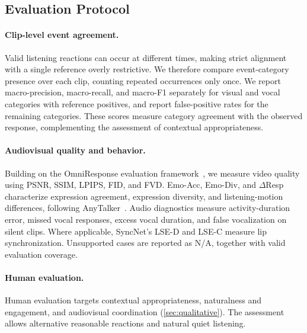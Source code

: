 \subsection{Evaluation Protocol}
\label{sec:evaluation}

\paragraph{Clip-level event agreement.}
Valid listening reactions can occur at different times,
making strict alignment with a single reference overly
restrictive. We therefore compare event-category presence
over each clip, counting repeated occurrences only once.
We report macro-precision, macro-recall, and macro-F1
separately for visual and vocal categories with reference
positives, and report false-positive rates for the remaining
categories. These scores measure category agreement with
the observed response, complementing the assessment of
contextual appropriateness.

\paragraph{Audiovisual quality and behavior.}
Building on the OmniResponse evaluation
framework~\cite{omniresponse}, we measure video quality
using PSNR, SSIM, LPIPS, FID, and FVD.
Emo-Acc, Emo-Div, and $\Delta$Resp characterize expression
agreement, expression diversity, and listening-motion
differences, following AnyTalker~\cite{anytalker}.
Audio diagnostics measure activity-duration error,
missed vocal responses, excess vocal duration, and false
vocalization on silent clips. Where applicable, SyncNet's LSE-D and LSE-C
measure lip synchronization. Unsupported cases are
reported as N/A, together with valid evaluation coverage.

\paragraph{Human evaluation.}
Human evaluation targets contextual appropriateness,
naturalness and engagement, and audiovisual coordination
(\cref{sec:qualitative}). The assessment allows alternative
reasonable reactions and natural quiet listening.